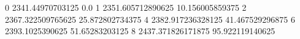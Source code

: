 0 2341.44970703125 0.0
1 2351.605712890625 10.156005859375
2 2367.322509765625 25.872802734375
4 2382.917236328125 41.467529296875
6 2393.1025390625 51.65283203125
8 2437.371826171875 95.922119140625
